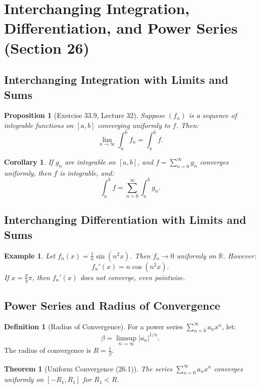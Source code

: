 \documentclass[9pt]{article}
\theoremstyle{definition}
\newtheorem{definition}{Definition}
\theoremstyle{plain}
\newtheorem{theorem}{Theorem}
\newtheorem{proposition}{Proposition}
\newtheorem{example}{Example}
\newtheorem{corollary}{Corollary}
\begin{document}
\section*{Interchanging Integration, Differentiation, and Power Series (Section 26)}

\subsection*{Interchanging Integration with Limits and Sums}
\begin{proposition}[Exercise 33.9, Lecture 32]
Suppose \( (f_n) \) is a sequence of integrable functions on \( [a, b] \) converging uniformly to \( f \). Then:
\[
\lim_{n \to \infty} \int_a^b f_n = \int_a^b f.
\]
\end{proposition}

\begin{corollary}
If \( g_n \) are integrable on \( [a, b] \), and \( f = \sum_{n=0}^\infty g_n \) converges uniformly, then \( f \) is integrable, and:
\[
\int_a^b f = \sum_{n=0}^\infty \int_a^b g_n.
\]
\end{corollary}

\subsection*{Interchanging Differentiation with Limits and Sums}
\begin{example}
Let \( f_n(x) = \frac{1}{n} \sin(n^2 x) \). Then \( f_n \to 0 \) uniformly on \( \mathbb{R} \). However:
\[
f_n'(x) = n \cos(n^2 x).
\]
If \( x = \frac{p}{q} \pi \), then \( f_n'(x) \) does not converge, even pointwise.
\end{example}

\subsection*{Power Series and Radius of Convergence}
\begin{definition}[Radius of Convergence]
For a power series \( \sum_{n=0}^\infty a_n x^n \), let:
\[
\beta = \limsup_{n \to \infty} |a_n|^{1/n}.
\]
The radius of convergence is \( R = \frac{1}{\beta} \).
\end{definition}

\begin{theorem}[Uniform Convergence (26.1)]
The series \( \sum_{n=0}^\infty a_n x^n \) converges uniformly on \( [-R_1, R_1] \) for \( R_1 < R \).
\end{theorem}
\end{document}
